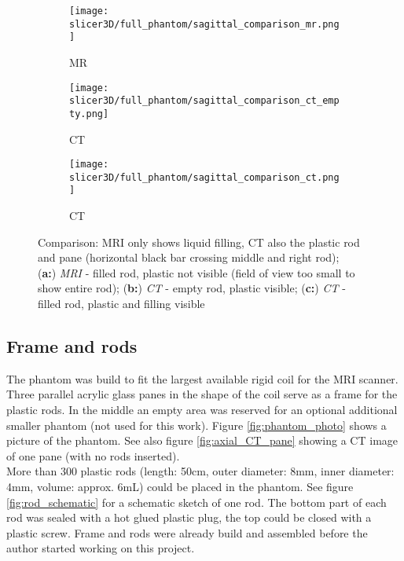 \begin{figure}[!htb]
\centering
  \begin{subfigure}[b]{0.1\textwidth}
    \texttt{[image: slicer3D/full\_phantom/sagittal\_comparison\_mr.png]}
    \caption{MR}
    \label{fig:sagittal_comparison_mr}
  \end{subfigure}
  \begin{subfigure}[b]{0.1\textwidth}
    \texttt{[image: slicer3D/full\_phantom/sagittal\_comparison\_ct\_empty.png]}
    \caption{CT}
    \label{fig:sagittal_comparison_ct_empty}
  \end{subfigure}
  \begin{subfigure}[b]{0.1\textwidth}
    \texttt{[image: slicer3D/full\_phantom/sagittal\_comparison\_ct.png]}
    \caption{CT}
    \label{fig:sagittal_comparison_ct}
  \end{subfigure}
  \caption{Comparison: MRI only shows liquid filling, CT also the plastic rod and pane (horizontal black bar crossing middle and right rod);\\ (\textbf{a:}) \textit{MRI} - filled rod, plastic not visible (field of view too small to show entire rod); (\textbf{b:}) \textit{CT} - empty rod, plastic visible; (\textbf{c:}) \textit{CT} - filled rod, plastic and filling visible}
  \label{fig:sagittal_comparison}
\end{figure}

\subsection{Frame and rods}

The phantom was build to fit the largest available rigid coil for the MRI scanner.
Three parallel acrylic glass panes in the shape of the coil serve as a frame for the plastic rods.
In the middle an empty area was reserved for an optional additional smaller phantom (not used for this work).
Figure \ref{fig:phantom_photo} shows a picture of the phantom. See also figure \ref{fig:axial_CT_pane} showing a CT image of one pane (with no rods inserted). \\
More than 300 plastic rods (length: 50cm, outer diameter: 8mm, inner diameter: 4mm, volume: approx. 6mL) could be placed in the phantom.
See figure \ref{fig:rod_schematic} for a schematic sketch of one rod.
The bottom part of each rod was sealed with a hot glued plastic plug, the top could be closed with a plastic screw.
Frame and rods were already build and assembled before the author started working on this project.


